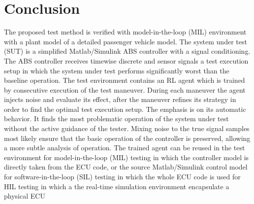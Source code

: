 \documentclass[a4paper, fleqn]{template/cas-dc}
\begin{document}
	\section{Conclusion}
	The proposed test method is verified with model-in-the-loop (MIL) environment with a plant model of a detailed passenger vehicle model. The system under test (SUT) is a simplified Matlab/Simulink ABS controller with a signal conditioning. The ABS controller receives timewise discrete and sensor signals a test execution setup in which the system under test performs significantly worst than the baseline operation. The test environment contains an RL agent which is trained by consecutive execution of the test maneuver. During each maneuver the agent injects noise and evaluate its effect, after the maneuver refines its strategy in order to find the optimal test execution setup.
	The emphasis is on its automatic behavior. It finds the most problematic operation of the system under test without the active guidance of the tester. Mixing noise to the true signal samples most likely ensure that the basic operation of the controller is preserved, allowing a more subtle analysis of operation.
	The trained agent can be reused in the test environment for model-in-the-loop (MIL) testing in which the controller model is directly taken from the ECU code, or the source Matlab/Simulink control model for software-in-the-loop (SIL) testing in which the whole ECU code is used for HIL testing in which a the real-time simulation environment encapsulate a physical ECU

		
	
				
	
	\listoftodos		
\end{document}
